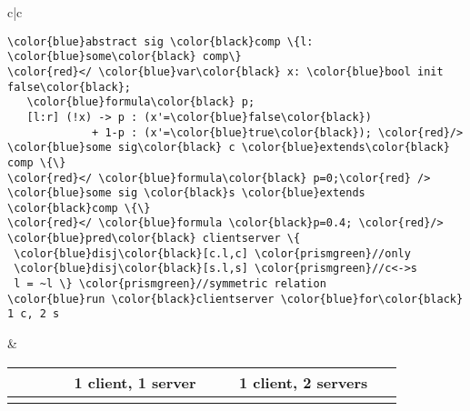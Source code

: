 \begin{figure*}
\setlength{\tabcolsep}{5pt}
\begin{tabular}{c|c}
\begin{minipage}{0.28\linewidth}
{\scriptsize
\begin{Verbatim}[commandchars=\\\{\},codes={\catcode`$=3\catcode`^=7\catcode`_=8}]
\color{blue}abstract sig \color{black}comp \{l: \color{blue}some\color{black} comp\}
\color{red}</ \color{blue}var\color{black} x: \color{blue}bool init false\color{black}; 
   \color{blue}formula\color{black} p;
   [l:r] (!x) -> p : (x'=\color{blue}false\color{black}) 
             + 1-p : (x'=\color{blue}true\color{black}); \color{red}/>
\color{blue}some sig\color{black} c \color{blue}extends\color{black} comp \{\}
\color{red}</ \color{blue}formula\color{black} p=0;\color{red} />
\color{blue}some sig \color{black}s \color{blue}extends \color{black}comp \{\}
\color{red}</ \color{blue}formula \color{black}p=0.4; \color{red}/>
\color{blue}pred\color{black} clientserver \{ 
 \color{blue}disj\color{black}[c.l,c] \color{prismgreen}//only
 \color{blue}disj\color{black}[s.l,s] \color{prismgreen}//c<->s
 l = ~l \} \color{prismgreen}//symmetric relation
\color{blue}run \color{black}clientserver \color{blue}for\color{black} 1 c, 2 s
\end{Verbatim}
}
\end{minipage}
&
\begin{minipage}{0.72\linewidth}

\begin{tabular}{>{\centering\arraybackslash}m{0.13\linewidth} >{\centering\arraybackslash}m{0.36\linewidth} >{\centering\arraybackslash}m{0.36\linewidth}}
\toprule
 & {\bf 1 client, 1 server} & {\bf 1 client, 2 servers}\\
\midrule

{\bf Structure} & 
\begin{tikzpicture}[mynode/.style = {draw,inner sep=1mm, fill=black!10, blur shadow={shadow blur steps=3}},scale=1.5, font=\scriptsize]
\node[mynode] (bbar) at (0,0) {c0};
\node[mynode] (bfoo0) at (1,0) {s0};

\begin{scope}[> = stealth,  -tipSq,black,thick, every node/.style = {black,right,align=center}]
\draw (bfoo0) edge node[xshift=-5mm, yshift=-2mm]       {[c0s0.r]}     (bbar);
\draw (bbar) edge node       {}     (bfoo0);
\end{scope}
\end{tikzpicture}
& 
\begin{tikzpicture}[mynode/.style = {draw,inner sep=1mm, fill=black!10, blur shadow={shadow blur steps=3}},scale=1.5, font=\scriptsize]


\end{tikzpicture}
\end{tabular}
\end{minipage}
\end{tabular}
\end{figure*}
